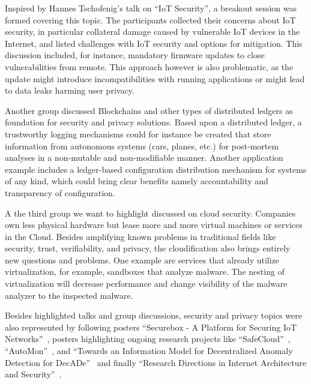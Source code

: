 
Inspired by Hannes Tschofenig's talk on ``IoT Security'', a breakout session was
formed covering this topic. The participants collected their concerns about IoT
security, in particular collateral damage caused by vulnerable IoT devices in
the Internet, and listed challenges with IoT security and options for
mitigation. This discussion included, for instance, mandatory firmware updates
to close vulnerabilities from remote. This approach however is also problematic,
as the update might introduce incompatibilities with running applications or
might lead to data leaks harming user privacy.

Another group discussed Blockchains and other types of distributed ledgers as
foundation for security and privacy solutions. Based upon a distributed ledger,
a trustworthy logging mechanisms could for instance be created that store
information from autonomous systems (cars, planes, etc.) for post-mortem
analyses in a non-mutable and non-modifiable manner. Another application example
includes a ledger-based configuration distribution mechanism for systems of any
kind, which could bring clear benefits namely accountability and transparency of
configuration.

A the third group we want to highlight discussed on cloud security. Companies
own less physical hardware but lease  more and more virtual machines or services
in the Cloud. Besides amplifying known problems in traditional fields like
security, trust, verifiability, and privacy, the cloudification also brings
entirely new questions and problems. One example are services that already
utilize virtualization, for example, sandboxes that analyze malware. The nesting
of virtualization will decrease performance and change visibility of the malware
analyzer to the inspected malware.

Besides highlighted talks and group discussions, security and privacy topics
were also represented by following posters ``Securebox - A Platform for Securing
IoT Networks''~\cite{hafeez:s3:2015, hafeez:can:2016}, posters highlighting
ongoing research projects like ``SafeCloud''~\cite{safecloud},
``AutoMon''~\cite{automon}, and ``Towards an Information Model for Decentralized
Anomaly Detection for DecADe''~\cite{decade} and finally ``Research Directions
in Internet Architecture and Security''~\cite{glra, mms, ipv6hitlist}.
